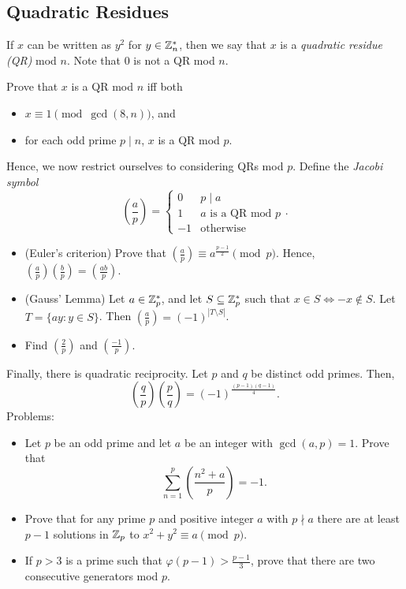 \subsection{Quadratic Residues}
If $x$ can be written as $y^2$ for $y\in\mathbb{Z}_n^*$, then we say that $x$ is a
\emph{quadratic residue (QR)} mod $n$. Note that $0$ is not a QR mod $n$.

Prove that $x$ is a QR mod $n$ iff both
\begin{itemize}
  \item $x\equiv 1\pmod{\gcd(8,n)}$, and
  \item for each odd prime $p\mid n$, $x$ is a QR mod $p$.
\end{itemize}

Hence, we now restrict ourselves to considering QRs mod $p$.
Define the \emph{Jacobi symbol}
\[\left(\frac ap\right)=\begin{cases} 0&p\mid a \\ 1&a\text{ is a QR mod }p \\
-1&\text{otherwise}\end{cases}.\]

\begin{itemize}
  \item (Euler's criterion) Prove that
    $\left(\frac ap\right)\equiv a^{\frac{p-1}2}\pmod p$.
    Hence, $\left(\frac ap\right)\left(\frac
    bp\right)=\left(\frac{ab}p\right)$.
  \item (Gauss' Lemma) Let $a\in\mathbb{Z}_p^*$, and let $S\subseteq\mathbb{Z}_p^*$ such that $x\in S\iff
    -x\not\in S$. Let $T=\{ay:y\in S\}$. Then
    $\left(\frac ap\right)=(-1)^{|T\setminus S|}$.
  \item Find $\left(\frac 2p\right)$ and $\left(\frac{-1}p\right)$.
\end{itemize}

Finally, there is quadratic reciprocity.
Let $p$ and $q$ be distinct odd primes. Then,
\[\left(\frac qp\right)\left(\frac pq\right)=(-1)^{\frac{(p-1)(q-1)}4}.\]
Problems:
\begin{itemize}
  \item Let $p$ be an odd prime and let $a$ be an integer with $\gcd(a,p)=1$.
    Prove that
    \[\sum_{n=1}^p\left(\frac{n^2+a}p\right)=-1.\]
  \item Prove that for any prime $p$ and positive integer $a$ with $p\nmid a$
    there are at least $p-1$ solutions in $\mathbb{Z}_p$ to $x^2+y^2\equiv a\pmod p$.
  \item If $p>3$ is a prime such that $\varphi(p-1)>\frac{p-1}3$, prove that
    there are two consecutive generators mod $p$.
\end{itemize}
